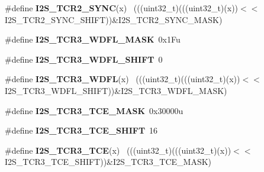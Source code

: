 \begin{DoxyCompactItemize}
\item 
\hypertarget{group___i2_s___register___masks_ga09f26fa241803f9f821314538bfa520b}{}\#define {\bfseries I2\+S\+\_\+\+T\+C\+R2\+\_\+\+S\+Y\+N\+C}(x)                                              ~(((uint32\+\_\+t)(((uint32\+\_\+t)(x))$<$$<$I2\+S\+\_\+\+T\+C\+R2\+\_\+\+S\+Y\+N\+C\+\_\+\+S\+H\+I\+F\+T))\&I2\+S\+\_\+\+T\+C\+R2\+\_\+\+S\+Y\+N\+C\+\_\+\+M\+A\+S\+K)\label{group___i2_s___register___masks_ga09f26fa241803f9f821314538bfa520b}

\item 
\hypertarget{group___i2_s___register___masks_ga49de2df89ebdb02cdb32c8a15f9ac7b4}{}\#define {\bfseries I2\+S\+\_\+\+T\+C\+R3\+\_\+\+W\+D\+F\+L\+\_\+\+M\+A\+S\+K}~0x1\+Fu\label{group___i2_s___register___masks_ga49de2df89ebdb02cdb32c8a15f9ac7b4}

\item 
\hypertarget{group___i2_s___register___masks_ga984179c79c4fc833f32c031c69a33cd9}{}\#define {\bfseries I2\+S\+\_\+\+T\+C\+R3\+\_\+\+W\+D\+F\+L\+\_\+\+S\+H\+I\+F\+T}~0\label{group___i2_s___register___masks_ga984179c79c4fc833f32c031c69a33cd9}

\item 
\hypertarget{group___i2_s___register___masks_gae18017d62dcbde7881d963b3217d0743}{}\#define {\bfseries I2\+S\+\_\+\+T\+C\+R3\+\_\+\+W\+D\+F\+L}(x)                                              ~(((uint32\+\_\+t)(((uint32\+\_\+t)(x))$<$$<$I2\+S\+\_\+\+T\+C\+R3\+\_\+\+W\+D\+F\+L\+\_\+\+S\+H\+I\+F\+T))\&I2\+S\+\_\+\+T\+C\+R3\+\_\+\+W\+D\+F\+L\+\_\+\+M\+A\+S\+K)\label{group___i2_s___register___masks_gae18017d62dcbde7881d963b3217d0743}

\item 
\hypertarget{group___i2_s___register___masks_ga27bcb7b4d391b96f7fd8f566579bf7e2}{}\#define {\bfseries I2\+S\+\_\+\+T\+C\+R3\+\_\+\+T\+C\+E\+\_\+\+M\+A\+S\+K}~0x30000u\label{group___i2_s___register___masks_ga27bcb7b4d391b96f7fd8f566579bf7e2}

\item 
\hypertarget{group___i2_s___register___masks_gab6791fd5b9271db39f4f91173ed3c30d}{}\#define {\bfseries I2\+S\+\_\+\+T\+C\+R3\+\_\+\+T\+C\+E\+\_\+\+S\+H\+I\+F\+T}~16\label{group___i2_s___register___masks_gab6791fd5b9271db39f4f91173ed3c30d}

\item 
\hypertarget{group___i2_s___register___masks_gae0bab25830b011173c849e48f0f3f717}{}\#define {\bfseries I2\+S\+\_\+\+T\+C\+R3\+\_\+\+T\+C\+E}(x)                                                ~(((uint32\+\_\+t)(((uint32\+\_\+t)(x))$<$$<$I2\+S\+\_\+\+T\+C\+R3\+\_\+\+T\+C\+E\+\_\+\+S\+H\+I\+F\+T))\&I2\+S\+\_\+\+T\+C\+R3\+\_\+\+T\+C\+E\+\_\+\+M\+A\+S\+K)\label{group___i2_s___register___masks_gae0bab25830b011173c849e48f0f3f717}


\end{DoxyCompactItemize}
